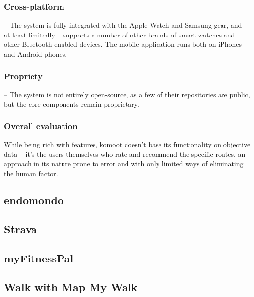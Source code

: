 \subsubsection*{Cross-platform} -- The system is fully integrated with the Apple Watch and Samsung gear, and -- at least limitedly -- supports a number of other brands of smart watches and other Bluetooth-enabled devices.
The mobile application runs both on iPhones and Android phones.
\subsubsection*{Propriety} -- The system is not entirely open-source, as a few of their repositories are public, but the core components remain proprietary. 

\subsubsection*{Overall evaluation}
While being rich with features, komoot doesn't base its functionality on objective data -- it's the users themselves who rate and recommend the specific routes,
an approach in its nature prone to error and with only limited ways of eliminating the human factor.

\subsection{endomondo}

\subsection{Strava}

\subsection{myFitnessPal}

\subsection{Walk with Map My Walk}